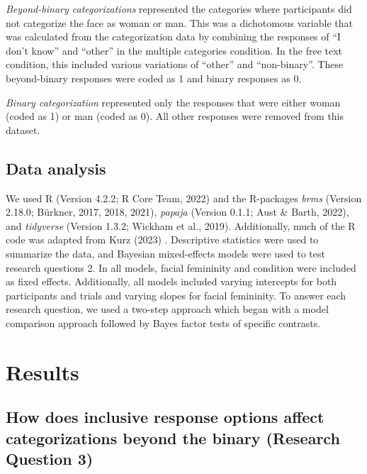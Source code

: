 \documentclass[
  man]{apa7}
\begin{document}
\emph{Beyond-binary categorizations} represented the categories where participants did not categorize the face as woman or man. This was a dichotomous variable that was calculated from the categorization data by combining the responses of ``I don't know'' and ``other'' in the multiple categories condition. In the free text condition, this included various variations of ``other'' and ``non-binary''. These beyond-binary responses were coded as 1 and binary responses as 0.

\emph{Binary categorization} represented only the responses that were either woman (coded as 1) or man (coded as 0). All other responses were removed from this dataset.

\hypertarget{data-analysis-1}{%
\subsection{Data analysis}\label{data-analysis-1}}

We used R (Version 4.2.2; R Core Team, 2022) and the R-packages \emph{brms} (Version 2.18.0; Bürkner, 2017, 2018, 2021), \emph{papaja} (Version 0.1.1; Aust \& Barth, 2022), and \emph{tidyverse} (Version 1.3.2; Wickham et al., 2019). Additionally, much of the R code was adapted from Kurz (2023) . Descriptive statistics were used to summarize the data, and Bayesian mixed-effects models were used to test research questions 2. In all models, facial femininity and condition were included as fixed effects. Additionally, all models included varying intercepts for both participants and trials and varying slopes for facial femininity. To answer each research question, we used a two-step approach which began with a model comparison approach followed by Bayes factor tests of specific contrasts.

\hypertarget{results-1}{%
\section{Results}\label{results-1}}

\hypertarget{how-does-inclusive-response-options-affect-categorizations-beyond-the-binary-research-question-3}{%
\subsection{How does inclusive response options affect categorizations beyond the binary (Research Question 3)}\label{how-does-inclusive-response-options-affect-categorizations-beyond-the-binary-research-question-3}}
\end{document}
